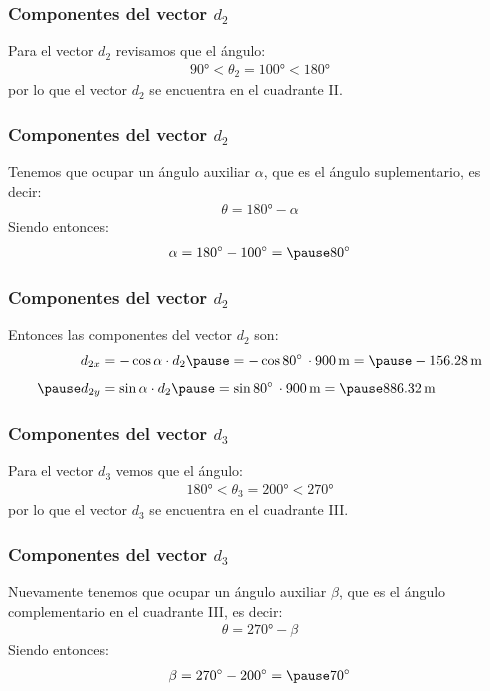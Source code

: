 \documentclass[12pt]{beamer}
\begin{document}
\begin{frame}
\frametitle{Componentes del vector $d_{2}$}
Para el vector $d_{2}$ revisamos que el ángulo:
\pause
\begin{eqnarray*}
\ang{90} < \theta_{2} = \ang{100} < \ang{180}
\end{eqnarray*}
\pause
por lo que el vector $d_{2}$ se encuentra en el cuadrante II.
\end{frame}
\begin{frame}
\frametitle{Componentes del vector $d_{2}$}
Tenemos que ocupar un ángulo auxiliar $\alpha$, que es el ángulo suplementario, es decir:
\pause
\begin{align*}
\theta = \ang{180} - \alpha
\end{align*}
\pause
Siendo entonces:
\pause
\begin{eqnarray*}
\alpha = \ang{180} - \ang{100} = \pause \ang{80}
\end{eqnarray*}
\end{frame}
\begin{frame}
\frametitle{Componentes del vector $d_{2}$}
Entonces las componentes del vector $d_{2}$ son:
\pause
\begin{eqnarray*}
\begin{aligned}
d_{2x} &= -\cos \alpha \cdot d_{2} \pause = -\cos \ang{80} \, \cdot \SI{900}{\meter} = \pause -\SI{156.28}{\meter} \\[0.5em] \pause
d_{2y} &= \sin \alpha \cdot d_{2} \pause = \sin \ang{80} \, \cdot \SI{900}{\meter} = \pause \SI{886.32}{\meter}
\end{aligned}
\end{eqnarray*}
\end{frame}
\begin{frame}
\frametitle{Componentes del vector $d_{3}$}
Para el vector $d_{3}$ vemos que el ángulo:
\pause
\begin{eqnarray*}
\ang{180} < \theta_{3} = \ang{200} < \ang{270}
\end{eqnarray*}
\pause
por lo que el vector $d_{3}$ se encuentra en el cuadrante III.
\end{frame}
\begin{frame}
\frametitle{Componentes del vector $d_{3}$}
Nuevamente tenemos que ocupar un ángulo auxiliar $\beta$, que es el ángulo complementario en el cuadrante III, es decir:
\pause
\begin{align*}
\theta = \ang{270} - \beta
\end{align*}
\pause
Siendo entonces:
\pause
\begin{eqnarray*}
\beta = \ang{270} - \ang{200} = \pause \ang{70}
\end{eqnarray*}
\end{frame}
\end{document}
